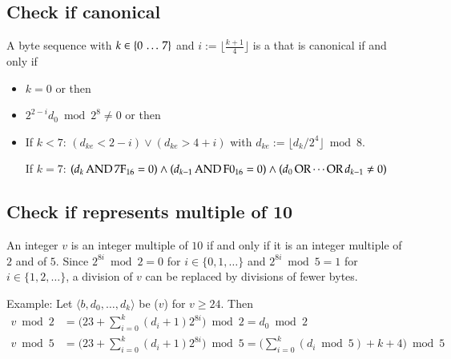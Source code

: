 \subsection{Check if canonical \DborBinaryRationalValue}
\label{sec:implementation:BinaryRationalValue:canonical}

A byte sequence  with
$k \in \{0 \,\ldots\, 7\}$ and $i := \lfloor \frac{k + 1}{4} \rfloor$
is a \DborBinaryRationalValue{} that is canonical if and only if
\begin{itemize}
    \item
    $k = 0$ or then

    \item
    $2^{2 - i} d_0 \bmod 2^8 \ne 0$ or then

    \item
    If $k < 7$:
    $(d_{ke} < 2 - i) \vee (d_{ke} > 4 + i)$
    with $d_{ke} := \lfloor d_k / 2^4 \rfloor \bmod 8$.

    If $k = 7$:
    $(d_k \operatorname{AND} \mathrm{7F}_{16} = 0) \wedge (d_{k - 1} \operatorname{AND} \mathrm{F0}_{16} = 0)
    \wedge (d_0 \operatorname{OR} \cdots \operatorname{OR} d_{k - 1} \ne 0)$
\end{itemize}


\subsection{Check if \DborIntegerValue{} represents multiple of 10}
\label{sec:implementation:IntegerValue:mod10}

An integer $v$ is an integer multiple of $10$ if and only if it is an integer multiple
of $2$ and of $5$.
Since $2^{8i} \bmod 2 = 0$ for $i \in \{0, 1, \ldots\}$
and $2^{8i} \bmod 5 = 1$ for $i \in \{1, 2, \ldots\}$,
a division of $v$ can be replaced by divisions of fewer bytes.

Example:
Let $\langle b, d_0, \ldots, d_k\rangle$ be \DborIntegerValue($v$) for $v \ge 24$.
Then
\begin{align*}
    v \bmod 2
        & = \big(23 + \sum_{i = 0}^k (d_i + 1) 2^{8 i}\big) \bmod 2
        = d_0 \bmod 2 \\
    v \bmod 5
        & = \big(23 + \sum_{i = 0}^k (d_i + 1) 2^{8 i}\big) \bmod 5
        = \big(\sum_{i = 0}^k (d_i \bmod 5) + k + 4\big) \bmod 5
\end{align*}
